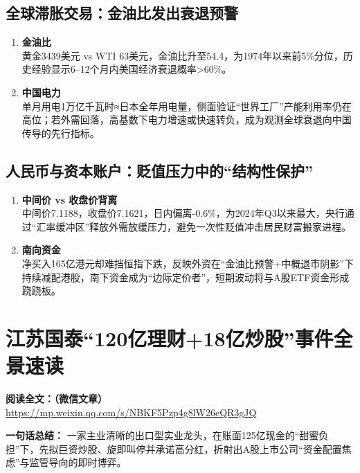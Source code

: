 \subsection{全球滞胀交易：金油比发出衰退预警}
\begin{enumerate}[leftmargin=*, nosep]
    \item \textbf{金油比}  \\
    黄金3439美元 vs WTI 63美元，金油比升至54.4，为1974年以来前5\%分位，历史经验显示6–12个月内美国经济衰退概率>60\%。  
    \item \textbf{中国电力}  \\
    单月用电1万亿千瓦时≈日本全年用电量，侧面验证“世界工厂”产能利用率仍在高位；若外需回落，高基数下电力增速或快速转负，成为观测全球衰退向中国传导的先行指标。
\end{enumerate}

\subsection{人民币与资本账户：贬值压力中的“结构性保护”}
\begin{enumerate}[leftmargin=*, nosep]
    \item \textbf{中间价 vs 收盘价背离}  \\
    中间价7.1188，收盘价7.1621，日内偏离-0.6\%，为2024年Q3以来最大，央行通过“汇率缓冲区”释放外需放缓压力，避免一次性贬值冲击居民财富搬家进程。  
    \item \textbf{南向资金}  \\
    净买入165亿港元却难挡恒指下跌，反映外资在“金油比预警+中概退市阴影”下持续减配港股，南下资金成为“边际定价者”，短期波动将与A股ETF资金形成跷跷板。
\end{enumerate}

\clearpage

\section{江苏国泰“120亿理财+18亿炒股”事件全景速读}
\vspace{1cm}
\noindent\textbf{阅读全文：（微信文章）} \url{https://mp.weixin.qq.com/s/NBKF5Pzp4g8lW26eQR3gJQ}

\textbf{一句话总结：}  
一家主业清晰的出口型实业龙头，在账面125亿现金的“甜蜜负担”下，先拟巨资炒股、旋即叫停并承诺高分红，折射出A股上市公司“资金配置焦虑”与监管导向的即时博弈。

